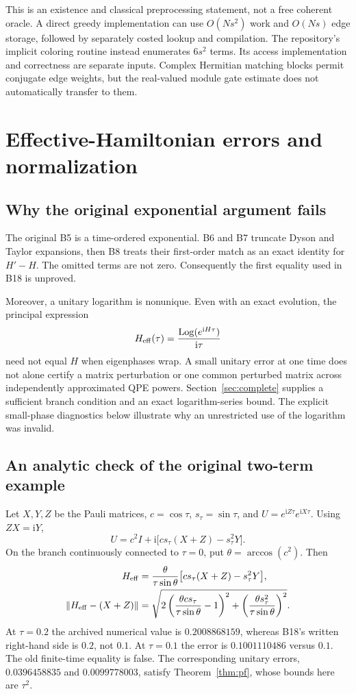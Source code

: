 \documentclass[11pt,a4paper]{article}
\newcommand{\norm}[1]{\left\lVert #1\right\rVert}
\newcommand{\ip}{\mathrm{i}}
\begin{document}
This is an existence and classical preprocessing statement, not a free coherent oracle. A direct greedy implementation can use $O(Ns^2)$ work and $O(Ns)$ edge storage, followed by separately costed lookup and compilation. The repository's implicit coloring routine instead enumerates $6s^2$ terms. Its access implementation and correctness are separate inputs. Complex Hermitian matching blocks permit conjugate edge weights, but the real-valued module gate estimate does not automatically transfer to them.

\section{Effective-Hamiltonian errors and normalization}
\subsection{Why the original exponential argument fails}
The original B5 is a time-ordered exponential. B6 and B7 truncate Dyson and Taylor expansions, then B8 treats their first-order match as an exact identity for $H'-H$. The omitted terms are not zero. Consequently the first equality used in B18 is unproved.

Moreover, a unitary logarithm is nonunique. Even with an exact evolution, the principal expression
\begin{equation}
 H_{\rm eff}(\tau)=\frac{\operatorname{Log}(e^{\ip H\tau})}{\ip\tau}
\end{equation}
need not equal $H$ when eigenphases wrap. A small unitary error at one time does not alone certify a matrix perturbation or one common perturbed matrix across independently approximated QPE powers. Section~\ref{sec:complete} supplies a sufficient branch condition and an exact logarithm-series bound. The explicit small-phase diagnostics below illustrate why an unrestricted use of the logarithm was invalid.

\subsection{An analytic check of the original two-term example}
Let $X,Y,Z$ be the Pauli matrices, $c=\cos\tau$, $s_\tau=\sin\tau$, and $U=e^{\ip Z\tau}e^{\ip X\tau}$. Using $ZX=\ip Y$,
\begin{equation}
 U=c^2I+\ip\big[c s_\tau(X+Z)-s_\tau^2Y\big].
\end{equation}
On the branch continuously connected to $\tau=0$, put $\theta=\arccos(c^2)$. Then
\begin{align}
 H_{\rm eff}&=\frac{\theta}{\tau\sin\theta}
       \big[c s_\tau(X+Z)-s_\tau^2Y\big],\\
 \norm{H_{\rm eff}-(X+Z)}
 &=\sqrt{2\left(\frac{\theta c s_\tau}{\tau\sin\theta}-1\right)^2
        +\left(\frac{\theta s_\tau^2}{\tau\sin\theta}\right)^2}.
\end{align}
At $\tau=0.2$ the archived numerical value is $0.2008868159$, whereas B18's written right-hand side is $0.2$, not $0.1$. At $\tau=0.1$ the error is $0.1001110486$ versus $0.1$. The old finite-time equality is false. The corresponding unitary errors, $0.0396458835$ and $0.0099778003$, satisfy Theorem~\ref{thm:pf}, whose bounds here are $\tau^2$.
\end{document}
